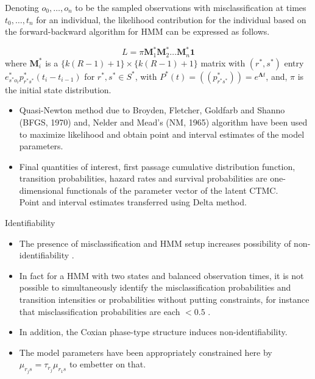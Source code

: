 \documentclass{beamer}
\begin{document}
\begin{frame}
Denoting $o_0,\ldots, o_{n}$ to be the sampled observations with misclassification at times $t_0,\ldots,t_{n}$ for an individual, the likelihood contribution for the individual based on the forward-backward algorithm for HMM can be expressed as follows.

\[
L=\pi \bm{M}_1^* \bm{M}_2^* \ldots \bm{M}_{n}^* \bm{1}
\]
where $\bm{M}_i^*$ is a $\{k(R-1) +1\} \times \{k(R-1) +1\}$ matrix with $(r^*,s^*)$ entry $e^*_{s^* o_i} p^*_{r^* s^*} (t_i - t_{i-1})$ for $r^*, s^* \in S^*$, with $P^*(t)=((p^*_{r^* s^*})) = e^{\bm{\Lambda}t}$,  and, $\pi$ is the initial state distribution.

\end{frame}
\begin{frame}
\begin{itemize}
\item Quasi-Newton method due to Broyden, Fletcher, Goldfarb and Shanno (BFGS, 1970) and, Nelder and Mead's (NM, 1965) algorithm have been used to maximize likelihood and obtain point and interval estimates of the model parameters.
\item Final quantities of interest, first passage cumulative distribution function, transition probabilities, hazard rates and survival probabilities are one-dimensional functionals of the parameter vector of the latent CTMC. \vspace{0.8mm} \\Point and interval estimates transferred using Delta method.
\end{itemize}
\end{frame}

\begin{frame}{Identifiability}
\begin{itemize}
\item The presence of misclassification and HMM setup increases possibility of non-identifiability \citep{macdonald1997hidden}.
\item In fact for a HMM with two states and balanced observation times, it is not possible to simultaneously identify the misclassification probabilities and transition intensities or probabilities without putting constraints, for instance that misclassification probabilities are each $<0.5$ \citep{rosychuk2003bias}.
\item In addition, the Coxian phase-type structure induces non-identifiability.
\item The model parameters have been appropriately constrained here by $\mu_{r_j s}=\tau_{r_j } \mu_{r_1 s}$ to embetter on that. 
\end{itemize}
\end{frame}
\end{document}

